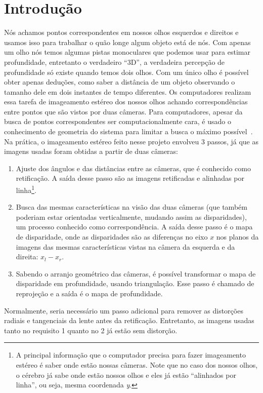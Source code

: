 \documentclass{bmvc2k}
\begin{document}
\section{Introdução}
\label{sec:intro}
Nós achamos pontos correspondentes em nossos olhos esquerdos e direitos e usamos isso para trabalhar o quão longe algum objeto está de nós. Com apenas um olho nós temos algumas pistas monoculares que podemos usar para estimar profundidade, entretanto o verdadeiro ``3D'', a verdadeira percepção de profundidade só existe quando temos dois olhos. Com um único olho é possível obter apenas deduções, como saber a distância de um objeto observando o tamanho dele em dois instantes de tempo diferentes. Os computadores realizam essa tarefa de imageamento estéreo dos nossos olhos achando correspondências entre pontos que são vistos por duas câmeras. Para computadores, apesar da busca de pontos correspondentes ser computacionalmente cara, é usado o conhecimento de geometria do sistema para limitar a busca o máximo possível~\cite{Hartley}. Na prática, o imageamento estéreo feito nesse projeto envolveu 3 passos, já que as imagens usadas foram obtidas a partir de duas câmeras:
\begin{enumerate}
\item Ajuste dos ângulos e das distâncias entre as câmeras, que é conhecido como retificação. A saída desse passo são as imagens retificadas e alinhadas por linha\footnote{A principal informação que o computador precisa para fazer imageamento estéreo é saber onde estão nossas câmeras. Note que no caso dos nossos olhos, o cérebro já sabe onde estão nossos olhos e eles já estão ``alinhados por linha'', ou seja, mesma coordenada \textit{y}.}.
\item Busca das mesmas características na visão das duas câmeras (que também poderiam estar orientadas verticalmente, mudando assim as disparidades), um processo conhecido como correspondência. A saída desse passo é o mapa de disparidade, onde as disparidades são as diferenças no eixo $x$ nos planos da imagens das mesmas características vistas na câmera da esquerda e da direita: $x_l - x_r$.
\item Sabendo o arranjo geométrico das câmeras, é possível transformar o mapa de disparidade em profundidade, usando triangulação. Esse passo é chamado de reprojeção e a saída é o mapa de profundidade.
\end{enumerate}

Normalmente, seria necessário um passo adicional para remover as distorções radiais e tangenciais da lente antes da retificação. Entretanto, as imagens usadas tanto no requisito 1 quanto no 2 já estão sem distorção.
\end{document}
